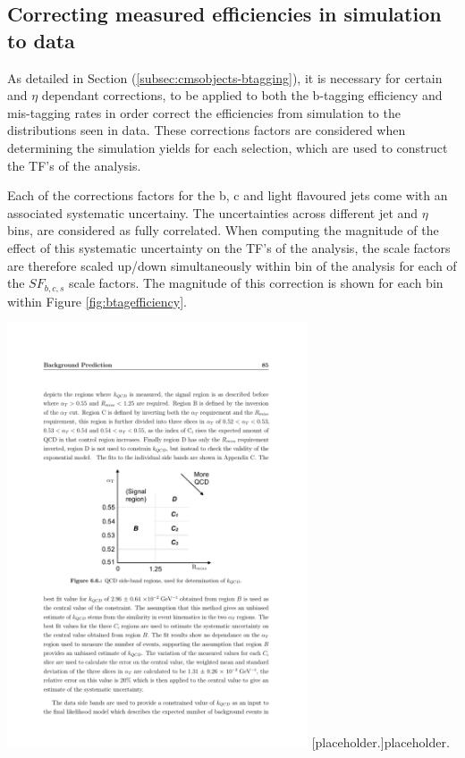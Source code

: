 \subsection{Correcting measured efficiencies in simulation to data}
\label{subsec:formulamethodsf}

As detailed in Section (\ref{subsec:cmsobjects-btagging}), it is necessary for certain \pt and $\eta$ dependant corrections, to be applied to both the b-tagging efficiency and mis-tagging rates in order correct the efficiencies from simulation to the distributions seen in data. These corrections factors are considered when determining the simulation yields for each selection, which are used to construct the \ac{TF}'s of the analysis. 

Each of the corrections factors for the b, c and light flavoured jets come with an associated systematic uncertainy. The uncertainties across different jet \pt and $\eta$ bins, are considered as fully correlated. When computing the magnitude of the effect of this systematic uncertainty on the \ac{TF}'s of the analysis, the scale factors are therefore scaled up/down simultaneously within \theht bin of the analysis for each of the $SF_{b,c,s}$ scale factors. The magnitude of this correction is shown for each \theht bin within Figure \ref{fig:btagefficiency}. 

\begin{minipage}{\linewidth}
\centering
\includegraphics[width = 3.5in]{plots/qcd_cartoon.pdf}
[placeholder.]{placeholder.}
\label{fig:btagefficiency}
\end{minipage}

